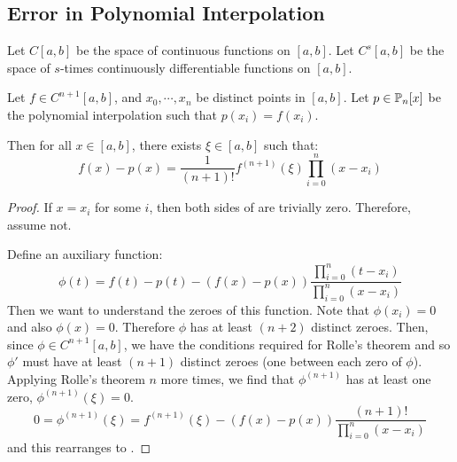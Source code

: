 \documentclass[../Main.tex]{subfiles}
\begin{document}
\subsection{Error in Polynomial Interpolation}
Let $C[a, b]$ be the space of continuous functions on $[a, b]$. Let $C^s[a, b]$ be the space of $s$-times continuously differentiable functions on $[a, b]$.

\begin{theorem}
    Let $f \in C^{n+1}[a, b]$, and $x_0, \cdots, x_n$ be distinct points in $[a, b]$. Let $p \in \P_n[x]$ be the polynomial interpolation such that $p(x_i) = f(x_i)$.

    Then for all $x \in [a, b]$, there exists $\xi \in [a, b]$ such that:
    \begin{equation}
        f(x) - p(x) = \frac{1}{(n+1)!} f^{(n+1)}(\xi) \prod_{i=0}^{n} (x - x_i)
        \label{eqnInterpError}
    \end{equation}
    \label{thmInterpError}
\end{theorem}
\begin{proof}
    If $x = x_i$ for some $i$, then both sides of  are trivially zero. Therefore, assume not.

    Define an auxiliary function:
    \begin{equation*}
        \phi(t) = f(t) - p(t) - (f(x) - p(x)) \frac{\prod_{i=0}^{n} (t - x_i)}{\prod_{i=0}^{n} (x - x_i)}
    \end{equation*}
    Then we want to understand the zeroes of this function. Note that $\phi(x_i) = 0$ and also $\phi(x) = 0$. Therefore $\phi$ has at least $(n+2)$ distinct zeroes. Then, since $\phi \in C^{n+1}[a, b]$, we have the conditions required for Rolle's theorem and so $\phi'$ must have at least $(n+1)$ distinct zeroes (one between each zero of $\phi$). Applying Rolle's theorem $n$ more times, we find that $\phi^{(n+1)}$ has at least one zero, $\phi^{(n+1)}(\xi) = 0$.
    \begin{equation*}
        0 = \phi^{(n+1)}(\xi) = f^{(n+1)}(\xi) - (f(x) - p(x)) \frac{(n+1)!}{\prod_{i=0}^{n} (x - x_i)}
    \end{equation*}
    and this rearranges to .
\end{proof}
\end{document}
